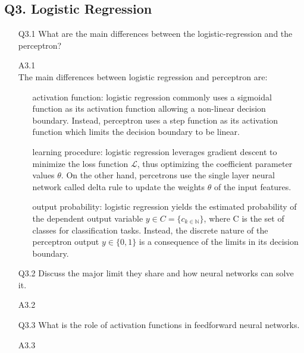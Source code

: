 \documentclass[unicode, 11pt, a4paper]{scrartcl}
\begin{document}
\subsection*{Q3. Logistic Regression}
\begin{itemize}
	\item[Q3.1] What are the main differences between the logistic-regression and the perceptron?

	\item[A3.1] ~\\
	      The main differences between logistic regression and perceptron are:
	      \begin{itemize}
		      \item[] activation function:
				logistic regression commonly uses a sigmoidal function as its activation function
				allowing a non-linear decision boundary.
				Instead, perceptron uses a step function as its activation function which 
				limits the decision boundary to be linear.

		      \item[] learning procedure:
		            logistic regression leverages gradient descent to minimize the loss function
		            $\mathcal{L}$, thus optimizing the coefficient parameter values $\theta$.
		            On the other hand, percetrons use the single layer neural network called
		            delta rule to update the weights $\theta$ of the input features.

		      \item[] output probability:
		            logistic regression yields the estimated probability of the dependent output variable
		            $y \in C = \{ c_{k \in \mathbb{N}} \}$, where C is the set of classes
		            for classification tasks.
		            Instead, the discrete nature of the perceptron output $y \in \{ 0, 1 \}$
		            is a consequence of the limits in its decision boundary.
	      \end{itemize}

	\item[Q3.2] Discuss the major limit they share and how neural networks can solve it.

	\item[A3.2] ~\\

	\item[Q3.3] What is the role of activation functions in feedforward neural networks.

	\item[A3.3] ~\\
\end{itemize}
\end{document}
